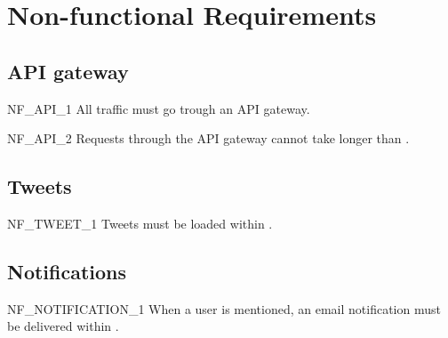 \chapter{Non-functional Requirements}

\tereqshowid%
\tereqshowicon%

\section{API gateway}

\begin{tereqdef}{NF_API_1}
    All traffic must go trough an API gateway.
\end{tereqdef}

\begin{tereqdef}{NF_API_2}
    Requests through the API gateway cannot take longer than .
\end{tereqdef}

\section{Tweets}

\begin{tereqdef}{NF_TWEET_1}
    Tweets must be loaded within .
\end{tereqdef}

\section{Notifications}

\begin{tereqdef}{NF_NOTIFICATION_1}
    When a user is mentioned, an email notification must be delivered within .
\end{tereqdef}
